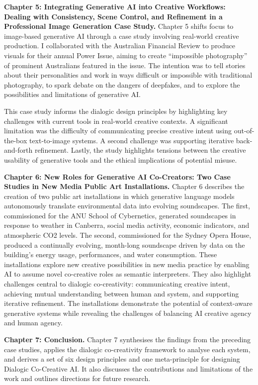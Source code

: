 \textbf{Chapter 5: Integrating Generative AI into Creative Workflows: Dealing with Consistency, Scene Control, and Refinement in a Professional Image Generation Case Study.} Chapter 5 shifts focus to image-based generative AI through a case study involving real-world creative production. I collaborated with the Australian Financial Review to produce visuals for their annual Power Issue, aiming to create ``impossible photography'' of prominent Australians featured in the issue. The intention was to tell stories about their personalities and work in ways difficult or impossible with traditional photography, to spark debate on the dangers of deepfakes, and to explore the possibilities and limitations of generative AI.

This case study informs the dialogic design principles by highlighting key challenges with current tools in real-world creative contexts. A significant limitation was the difficulty of communicating precise creative intent using out-of-the-box text-to-image systems. A second challenge was supporting iterative back-and-forth refinement. Lastly, the study highlights tensions between the creative usability of generative tools and the ethical implications of potential misuse.

\textbf{Chapter 6: New Roles for Generative AI Co-Creators: Two Case Studies in New Media Public Art Installations.} Chapter 6 describes the creation of two public art installations in which generative language models autonomously translate environmental data into evolving soundscapes. The first, commissioned for the ANU School of Cybernetics, generated soundscapes in response to weather in Canberra, social media activity, economic indicators, and atmospheric CO2 levels. The second, commissioned for the Sydney Opera House, produced a continually evolving, month-long soundscape driven by data on the building's energy usage, performances, and water consumption.
These installations explore new creative possibilities in new media practice by enabling AI to assume novel co-creative roles as semantic interpreters. They also highlight challenges central to dialogic co-creativity: communicating creative intent, achieving mutual understanding between human and system, and supporting iterative refinement. The installations demonstrate the potential of context-aware generative systems while revealing the challenges of balancing AI creative agency and human agency.

\textbf{Chapter 7: Conclusion.} Chapter 7 synthesises the findings from the preceding case studies, applies the dialogic co-creativity framework to analyse each system, and derives a set of six design principles and one meta-principle for designing Dialogic Co-Creative AI. It also discusses the contributions and limitations of the work and outlines directions for future research.


